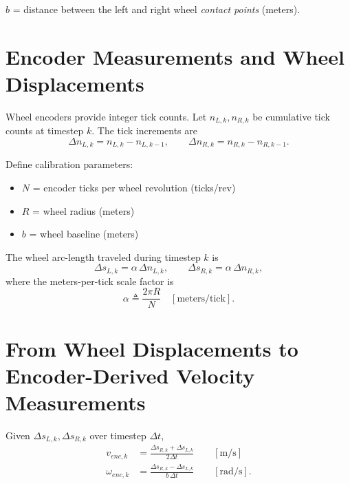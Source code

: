 \documentclass[11pt]{article}
\begin{document}
\begin{center}
\end{center}

$b$ = distance between the left and right wheel \emph{contact points} (meters).

\section*{Encoder Measurements and Wheel Displacements}

Wheel encoders provide integer tick counts. Let $n_{L,k}, n_{R,k}$ be cumulative tick counts at timestep $k$.
The tick increments are
\begin{equation}
\Delta n_{L,k}=n_{L,k}-n_{L,k-1}, \qquad \Delta n_{R,k}=n_{R,k}-n_{R,k-1}.
\end{equation}

Define calibration parameters:
\begin{itemize}
\item $N$ = encoder ticks per wheel revolution (ticks/rev)
\item $R$ = wheel radius (meters)
\item $b$ = wheel baseline (meters)
\end{itemize}

The wheel arc-length traveled during timestep $k$ is
\begin{equation}
\Delta s_{L,k} = \alpha\,\Delta n_{L,k}, \qquad \Delta s_{R,k} = \alpha\,\Delta n_{R,k},
\end{equation}
where the meters-per-tick scale factor is
\begin{equation}
\alpha \triangleq \frac{2\pi R}{N} \quad [\text{meters/tick}].
\end{equation}

\section*{From Wheel Displacements to Encoder-Derived Velocity Measurements}

Given $\Delta s_{L,k}, \Delta s_{R,k}$ over timestep $\Delta t$,
\begin{align}
v_{enc,k} &= \frac{\Delta s_{R,k} + \Delta s_{L,k}}{2\Delta t} \qquad [\text{m/s}] \\
\omega_{enc,k} &= \frac{\Delta s_{R,k} - \Delta s_{L,k}}{b\,\Delta t} \qquad [\text{rad/s}].
\end{align}
\end{document}
